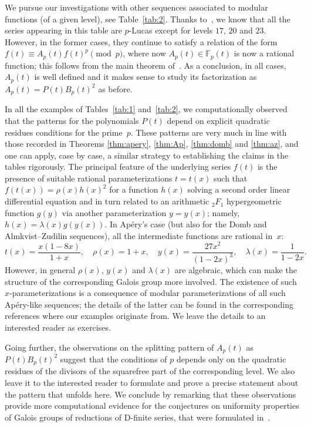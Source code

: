 \documentclass{article}
\newcommand{\F}{\mathbb{F}}
\theoremstyle{definition}
\theoremstyle{plain}
\theoremstyle{remark}
\begin{document}
We pursue our investigations with other sequences associated to modular functions (of a given level), see Table~\ref{tab:2}.
Thanks to~\cite{ABD19,BTY25}, we know that all the series appearing in this table are $p$-Lucas except for levels $17$, $20$ and $23$.
However, in the former cases, they continue to satisfy a relation of the form $f(t) \equiv A_p(t) f(t)^p \pmod p$, where now $A_p(t) \in \F_p(t)$ is now a rational function; this follows from the main theorem of~\cite{Var23}.
As a conclusion, in all cases, $A_p(t)$ is well defined and it makes sense to study its factorization as $A_p(t) = P(t) B_p(t)^2$ as before.

In all the examples of Tables~\ref{tab:1} and~\ref{tab:2}, we computationally observed that the patterns for the polynomials $P(t)$ depend on explicit quadratic residues conditions for the prime~$p$.
 These patterns are very much in line with those recorded in Theorems \ref{thm:apery}, \ref{thm:Ap}, \ref{thm:domb} and \ref{thm:az}, and one can apply, case by case, a similar strategy to establishing the claims in the tables rigorously.
The principal feature of the underlying series $f(t)$ is the presence of suitable rational parameterizations $t=t(x)$ such that $f(t(x))=\rho(x)h(x)^2$ for a function $h(x)$ solving a second order linear differential equation and in turn related to an arithmetic $_2F_1$ hypergeometric function $g(y)$ via another parameterization $y=y(x)$; namely, $h(x)=\lambda(x)g(y(x))$.
In Ap\'ery's case (but also for the Domb and Almkvist--Zudilin sequences), all the intermediate functions are rational in~$x$:
\[
t(x)=\frac{x(1-8x)}{1+x}, \quad \rho(x)=1+x, \quad y(x)=\frac{27x^2}{(1-2x)^3}, \quad \lambda(x)=\frac1{1-2x}.
\]
However, in general $\rho(x)$, $y(x)$ and $\lambda(x)$ are algebraic, which can make the structure of the corresponding Galois group more involved.
The existence of such $x$-parameterizations is a consequence of modular parameterizations of all such Ap\'ery-like sequences; the details of the latter can be found in the corresponding references where our examples originate from. We leave the details to an interested reader as exercises.

Going further, the observations on the splitting pattern of $A_p(t)$ as $P(t)B_p(t)^2$ suggest that the conditions of $p$ depends only on the quadratic residues of the divisors of the squarefree part of the corresponding level.
We also leave it to the interested reader to formulate and prove a precise statement about the pattern that unfolds here. We conclude by remarking that these observations provide more computational evidence for the conjectures on uniformity properties of Galois groups of reductions of D-finite series, that were formulated in~\cite{CFV25}. 
 
\end{document}

